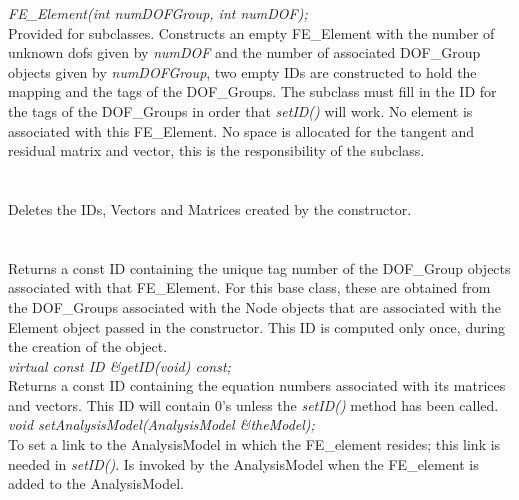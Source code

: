 {\em FE\_Element(int numDOFGroup, int numDOF);}  \\
Provided for subclasses. Constructs an empty FE\_Element with the
number of unknown dofs given by {\em numDOF} and the number of
associated DOF\_Group objects given by {\em numDOFGroup}, two empty IDs
are constructed to hold the mapping and the tags of the
DOF\_Groups. The subclass must fill in the ID for the tags of the
DOF\_Groups in order that {\em setID()} will work. No element is
associated with this FE\_Element. No space is allocated for the
tangent and residual matrix and vector, this is the responsibility of
the subclass. \\  

  \\
  \\
Deletes the IDs, Vectors and Matrices created by the constructor. \\

  \\
 \\
Returns a const ID containing the unique tag number of the
DOF\_Group objects associated with that FE\_Element. For this base class,
these are obtained from the DOF\_Groups associated with the Node objects
that are associated with the Element object passed in the constructor. This
ID is computed only once, during the creation of the object. \\

{\em virtual const ID \&getID(void) const;} \\
Returns a const ID containing the equation numbers associated with its
matrices and vectors. This ID will contain $0$'s unless the {\em
setID()} method has been called.\\

{\em void setAnalysisModel(AnalysisModel \&theModel);} \\
To set a link to the AnalysisModel in which the FE\_element
resides; this link is needed in {\em setID()}. Is invoked by the
AnalysisModel when the FE\_element is added to the AnalysisModel. \\


